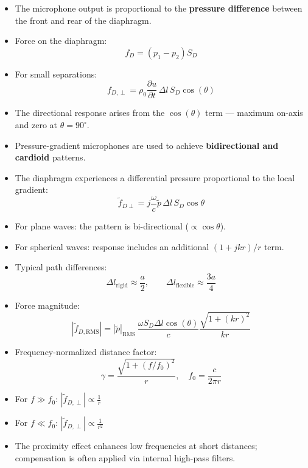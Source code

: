 \begin{tcolorbox}[colback=gray!10!white,colframe=black,title=\textbf{Summary – Pressure Gradient Microphones}]
\begin{itemize}
    \item The microphone output is proportional to the \textbf{pressure difference} between the front and rear of the diaphragm.
    \item Force on the diaphragm:
    \[
    f_D = (p_1 - p_2) S_D
    \]
    \item For small separations:
    \[
    f_{D,\perp} = \rho_0 \frac{\partial u}{\partial t} \, \Delta l \, S_D \cos(\theta)
    \]
    \item The directional response arises from the \( \cos(\theta) \) term — maximum on-axis and zero at \( \theta = 90^\circ \).
    \item Pressure-gradient microphones are used to achieve \textbf{bidirectional and cardioid} patterns.
\end{itemize}
\end{tcolorbox}


\begin{tcolorbox}[colback=gray!10!white,colframe=black,title=\textbf{Summary – Pressure Gradient Microphone (Frequency Domain)}]
\begin{itemize}
    \item The diaphragm experiences a differential pressure proportional to the local gradient:
    \[
    \tilde{f}_{D\perp} = j \frac{\omega}{c} \tilde{p} \, \Delta l \, S_D \cos \theta
    \]
    \item For plane waves: the pattern is bi-directional (\( \propto \cos \theta \)).
    \item For spherical waves: response includes an additional \( (1 + jkr)/r \) term.
    \item Typical path differences:
    \[
    \Delta l_{\text{rigid}} \approx \frac{a}{2}, \qquad \Delta l_{\text{flexible}} \approx \frac{3a}{4}
    \]
\end{itemize}
\end{tcolorbox}


\begin{tcolorbox}[colback=gray!10!white,colframe=black,title=\textbf{Summary – Distance and Frequency Dependence}]
\begin{itemize}
    \item Force magnitude:
    \[
    |\tilde{f}_{D,\text{RMS}}| = |\tilde{p}|_{\text{RMS}} \, \frac{\omega S_D \Delta l \cos(\theta)}{c} \frac{\sqrt{1 + (k r)^2}}{k r}
    \]
    \item Frequency-normalized distance factor:
    \[
    \gamma = \frac{\sqrt{1 + (f/f_0)^2}}{r}, \quad f_0 = \frac{c}{2\pi r}
    \]
    \item For \( f \gg f_0 \): \( |\tilde{f}_{D,\perp}| \propto \frac{1}{r} \)
    \item For \( f \ll f_0 \): \( |\tilde{f}_{D,\perp}| \propto \frac{1}{r^2} \)
    \item The proximity effect enhances low frequencies at short distances; compensation is often applied via internal high-pass filters.
\end{itemize}
\end{tcolorbox}


